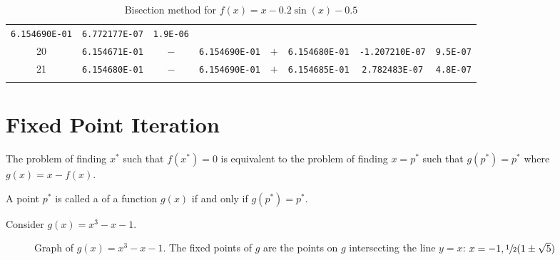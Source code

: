 \begin{example}
\begin{longtable}[t]{c|c|c|c|c|c|c|c}
        \texttt{6.154690E-01} & \texttt{6.772177E-07}  & \texttt{1.9E-06} \\
        20                    &
        \texttt{6.154671E-01} & \(-\)                  &
        \texttt{6.154690E-01} & \(+\)                  &
        \texttt{6.154680E-01} & \texttt{-1.207210E-07} & \texttt{9.5E-07} \\
        21                    &
        \texttt{6.154680E-01} & \(-\)                  &
        \texttt{6.154690E-01} & \(+\)                  &
        \texttt{6.154685E-01} & \texttt{2.782483E-07}  & \texttt{4.8E-07}
        \\
        \caption{Bisection method for \( f(x) = x - 0.2 \sin(x) - 0.5 \)}
    \end{longtable}
\end{example}

\newpage
\section{Fixed Point Iteration}

\begin{note}
    The problem of finding \( x^\ast \) such that \( f(x^\ast) = 0 \) is equivalent to the problem of finding \( x = p^\ast \) such that \( g(p^\ast) = p^\ast \) where \( g(x) = x - f(x) \).
\end{note}

\begin{definition}
    A point \( p^\ast \) is called a  of a function \( g(x) \) if and only if \( g(p^\ast) = p^\ast \).
\end{definition}

\begin{example}
    Consider \( g(x) = x^3 - x - 1 \).
    \begin{figure}[H]
        \centering
        \caption{Graph of \( g(x) = x^3 - x - 1 \). The fixed points of \( g \) are the points on \( g \) intersecting the line \( y = x \): \( x = -1, \sfrac{1}{2}(1 \pm \sqrt5) \)}
    \end{figure}
\end{example}

